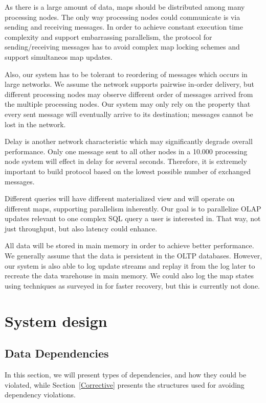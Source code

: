 \documentclass{sig-semester}
\def\SQL{SQL\xspace}
\def\OLAP{OLAP\xspace}
\def\OLTP{OLTP\xspace}
\begin{document}
As there is a large amount of data, maps should be distributed among many processing nodes. The only way processing nodes could communicate is via sending and receiving messages. In order to achieve constant execution time complexity and support embarrassing parallelism, the protocol for sending/receiving messages has to avoid complex map locking schemes and support simultaneos map updates.

Also, our system has to be tolerant to reordering of messages which occurs in large networks. We assume the network supports pairwise in-order delivery, but different processing nodes may observe different order of messages arrived from the multiple processing nodes. Our system may only rely on the property that every sent message will eventually arrive to its destination; messages cannot be lost in the network.

Delay is another network characteristic which may significantly degrade overall performance. Only one message sent to all other nodes in a 10.000 processing node system will effect in delay for several seconds. Therefore, it is extremely important to build protocol based on the lowest possible number of exchanged messages.
 
Different queries will have different materialized view and will operate on different maps, supporting parallelism inherently. Our goal is to parallelize \OLAP updates relevant to one complex \SQL query a user is interested in. That way, not just throughput, but also latency could enhance.

All data will be stored in main memory in order to achieve better performance. 
We generally assume that the data is persistent in the \OLTP databases.
However, our system is also able to
log update streams and replay it from the
log later to recreate the data warehouse in main memory.
We could also log the map states using techniques as surveyed in
\cite{DBLP:journals/pvldb/SallesCSDGKW09}
for faster recovery, but this is currently not done.

\section{System design}
\label{sec:sysdesign}
\vspace{2mm}

\subsection{Data Dependencies}
In this section, we will present types of dependencies, and how they could be violated, while Section~\ref{Corrective} presents the structures used for avoiding dependency violations.
\end{document}
